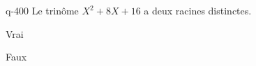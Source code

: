\begin{truefalse}{q-400}
Le trinôme $X^2+8X+16$ a deux racines distinctes.
\item Vrai
\item* Faux
\end{truefalse}

